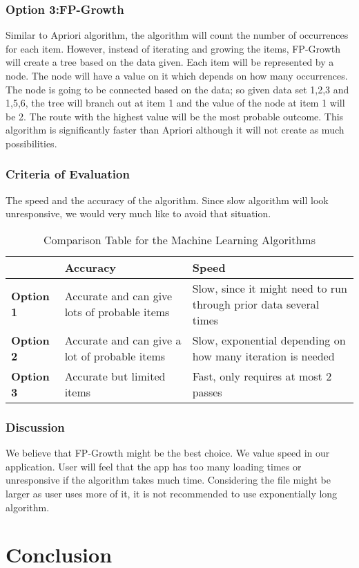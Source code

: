 \documentclass[journal,compsoc, 10pt, draftclsnofoot, onecolumn]{IEEEtran}
\begin{document}
\subsubsection{Option 3:FP-Growth}
Similar to Apriori algorithm, the algorithm will count the number of occurrences for each item. However, instead of iterating and growing the items, FP-Growth will create a tree based on the data given. Each item will be represented by a node. The node will have a value on it which depends on how many occurrences. The node is going to be connected based on the data; so given data set {1,2,3} and {1,5,6}, the tree will branch out at item 1 and the value of the node at item 1 will be 2. The route with the highest value will be the most probable outcome. This algorithm is significantly faster than Apriori although it will not create as much possibilities. 

\subsubsection{Criteria of Evaluation}
The speed and the accuracy of the algorithm. Since slow algorithm will look unresponsive, we would very much like to avoid that situation.

\begin{table}[h]
	\centering
	\caption{Comparison Table for the Machine Learning Algorithms}
	\label{Comparison Table for the Machine Learning Algorithms}
	\begin{tabularx}{\textwidth}{|X|X|X|}
		\hline
		\textbf{}         & \textbf{Accuracy}                & \textbf{Speed} 
		\\ \hline
		\textbf{Option 1} & Accurate and can give lots of probable items & Slow, since it might need to run through prior data several times
		\\ \hline
		\textbf{Option 2} & Accurate and can give a lot of probable items & Slow, exponential depending on how many iteration is needed                                                                                       
		\\ \hline
		\textbf{Option 3} & Accurate but limited items & Fast, only requires at most 2 passes                                                              
		\\ \hline
	\end{tabularx}
\end{table}

\subsubsection{Discussion}
We believe that FP-Growth might be the best choice. We value speed in our application. User will feel that the app has too many loading times or unresponsive if the algorithm takes much time. Considering the file might be larger as user uses more of it, it is not recommended to use exponentially long algorithm.
\section{Conclusion}
\end{document}
